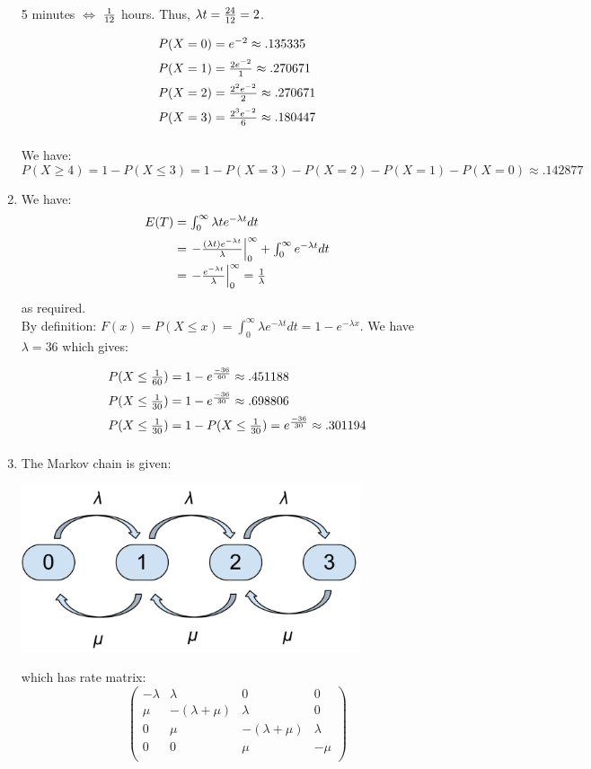 \documentclass[12pt]{article}
\begin{document}
\begin{enumerate}
5 minutes $\Leftrightarrow$ ${1\over 12}$ hours. Thus, $\lambda t={24\over12}=2$.


$$\begin{array}{@{}r@{\;}c@{\;}l@{}}
P(X=0)&=&e^{-2}\approx .135335\\[2mm]
P(X=1)&=&{2e^{-2}\over1}\approx .270671\\[2mm]
P(X=2)&=&{2^2e^{-2}\over2}\approx .270671\\[2mm]
P(X=3)&=&{2^3e^{-2}\over6}\approx .180447\\[2mm]
\end{array}$$

We have: $$P(X\geq 4)=1-P(X\leq 3)=1-P(X=3)-P(X=2)-P(X=1)-P(X=0)\approx.142877$$

\item We have:
$$\begin{array}{@{}r@{\;}c@{\;}l@{}}
E(T)&=&\int_{0}^{\infty}\lambda te^{-\lambda t}dt\\[2mm]
    &=&\left.-{(\lambda t)e^{-\lambda t}\over \lambda}\right|_{0}^\infty+\int_{0}^{\infty}e^{-\lambda t}dt\\[2mm]
    &=&\left.-{e^{-\lambda t}\over \lambda}\right|_{0}^\infty={1\over \lambda}\\[2mm]
\end{array}$$
  as required.\\
  By definition: $F(x)=P(X\leq x)=\int_{0}^{\infty}\lambda e^{-\lambda t}dt=1-e^{-\lambda x}$. We have $\lambda=36$ which gives:

$$\begin{array}{@{}r@{\;}c@{\;}l@{}}
P(X\leq{1\over60})&=&1-e^{-36\over 60}\approx .451188\\[2mm]
P(X\leq{1\over30})&=&1-e^{-36\over 30}\approx .698806\\[2mm]
P(X\leq{1\over30})&=&1-P(X\leq{1\over30})=e^{-36\over 30}\approx .301194\\[2mm]
\end{array}$$

\item

The Markov chain is given:
\begin{center}
\includegraphics[width=10cm]{exercise_5_markov_chain}
\end{center}
which has rate matrix:
$$\begin{pmatrix}
-\lambda & \lambda & 0&0\\
\mu &-(\lambda + \mu )&\lambda&0\\
0 & \mu &-(\lambda+\mu)&\lambda\\
0 & 0 &\mu&-\mu\\
\end{pmatrix}
$$


\end{enumerate}
\end{document}
